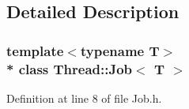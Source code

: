 \subsection{Detailed Description}
\subsubsection*{template$<$typename T$>$\\*
class Thread\+::\+Job$<$ T $>$}



Definition at line 8 of file Job.\+h.

